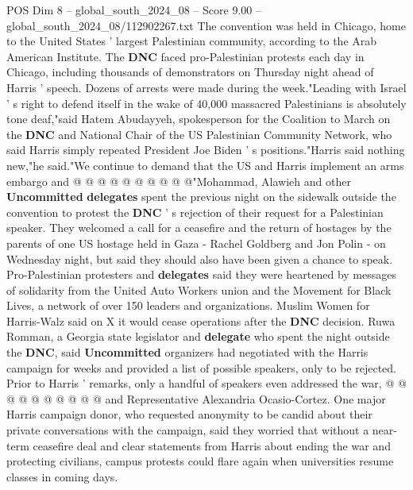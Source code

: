\begin{textsample}{POS Dim 8 – global\_south\_2024\_08 – Score 9.00 – global\_south\_2024\_08/112902267.txt}
The convention was held in Chicago, home to the United States ' largest Palestinian community, according to the Arab American Institute.
The \textbf{DNC} faced pro-Palestinian protests each day in Chicago, including thousands of demonstrators on Thursday night ahead of Harris ' speech.
Dozens of arrests were made during the week."Leading with Israel ' s right to defend itself in the wake of 40,000 massacred Palestinians is absolutely tone deaf,"said Hatem Abudayyeh, spokesperson for the Coalition to March on the \textbf{DNC} and National Chair of the US Palestinian Community Network, who said Harris simply repeated President Joe Biden ' s positions."Harris said nothing new,"he said."We continue to demand that the US and Harris implement an arms embargo and @ @ @ @ @ @ @ @ @ @"Mohammad, Alawieh and other \textbf{Uncommitted} \textbf{delegates} spent the previous night on the sidewalk outside the convention to protest the \textbf{DNC} ' s rejection of their request for a Palestinian speaker.
They welcomed a call for a ceasefire and the return of hostages by the parents of one US hostage held in Gaza - Rachel Goldberg and Jon Polin - on Wednesday night, but said they should also have been given a chance to speak.
Pro-Palestinian protesters and \textbf{delegates} said they were heartened by messages of solidarity from the United Auto Workers union and the Movement for Black Lives, a network of over 150 leaders and organizations.
Muslim Women for Harris-Walz said on X it would cease operations after the \textbf{DNC} decision.
Ruwa Romman, a Georgia state legislator and \textbf{delegate} who spent the night outside the \textbf{DNC}, said \textbf{Uncommitted} organizers had negotiated with the Harris campaign for weeks and provided a list of possible speakers, only to be rejected.
Prior to Harris ' remarks, only a handful of speakers even addressed the war, @ @ @ @ @ @ @ @ @ @ and Representative Alexandria Ocasio-Cortez.
One major Harris campaign donor, who requested anonymity to be candid about their private conversations with the campaign, said they worried that without a near-term ceasefire deal and clear statements from Harris about ending the war and protecting civilians, campus protests could flare again when universities resume classes in coming days.

\end{textsample}
